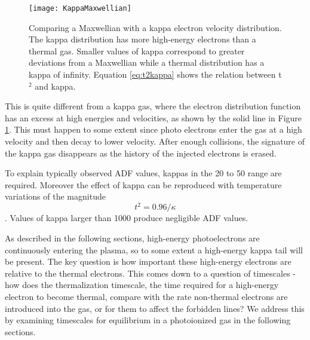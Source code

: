\documentclass[debug, preprint, twocolumn]{rmaa}
\begin{document}
\begin{figure}[t]
\texttt{[image: KappaMaxwellian]}
\caption[Maxwellian vs kappa electron distributions]{Comparing a Maxwellian
with a kappa electron velocity distribution.
The kappa distribution has more high-energy electrons than a thermal gas.
Smaller values of kappa correspond to greater deviations from a Maxwellian
while a thermal distribution has a kappa of infinity.
Equation \ref{eq:t2kappa} shows the relation between t$^2$ and kappa.
\label{fig:MaxwellianKappa}}
\end{figure}

This is quite different from a kappa gas, where the 
electron distribution function has an excess at high energies and velocities, as shown by
the solid line in Figure \ref{fig:MaxwellianKappa}.
This must happen to some extent since photo electrons
enter the gas at a  high velocity and then decay to lower velocity. 
After enough collisions, the signature 
of the kappa gas disappears as the history of the injected electrons is erased.

To explain typically observed ADF  values,  kappas in the 20 to 50 range  are required. 
Moreover the effect of kappa can be reproduced with temperature variations of the magnitude 
\begin{equation}
\label{eq:t2kappa}
t^2= 0.96/\kappa 
\end{equation}
\citep{2013ApJ...778...89P}. 
Values of kappa larger than 1000 produce  negligible ADF values. 

As described in the following sections, high-energy photoelectrons are continuously entering
the plasma, so to some extent a high-energy kappa tail will be present.
The key question is how important these high-energy electrons are relative to the thermal electrons.
This comes down to a question of timescales - how does the thermalization timescale, the time
required for a high-energy electron to become thermal, compare with the rate non-thermal electrons
are introduced into the gas, or for them to affect the forbidden lines?  
We address this by examining timescales for equilibrium in a photoionized gas in the following sections.


\end{document}

